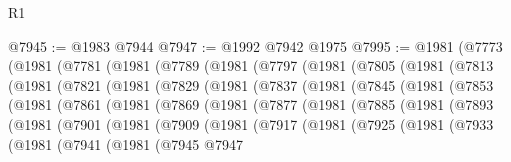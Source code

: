 \begin{lexlean}{R1}
\begin{coremodule}
@7945 := @1983 @7944
@7947 := @1992 @7942 @1975
@7995 := @1981
    (@7773
      (@1981
        (@7781
          (@1981
            (@7789
              (@1981
                (@7797
                  (@1981
                    (@7805
                      (@1981
                        (@7813
                          (@1981
                            (@7821
                              (@1981
                                (@7829
                                  (@1981
                                    (@7837
                                      (@1981
                                        (@7845
                                          (@1981
                                            (@7853
                                              (@1981
                                                (@7861
                                                  (@1981
                                                    (@7869
                                                      (@1981
                                                        (@7877
                                                          (@1981
                                                            (@7885
                                                              (@1981
                                                                (@7893
                                                                  (@1981
                                                                    (@7901
                                                                      (@1981
                                                                        (@7909
                                                                          (@1981
                                                                            (@7917
                                                                              (@1981
                                                                                (@7925
                                                                                  (@1981
                                                                                    (@7933
                                                                                      (@1981
                                                                                        (@7941
                                                                                          (@1981
                                                                                            (@7945
                                                                                              @7947

\end{coremodule}
\end{lexlean}
